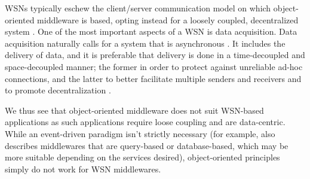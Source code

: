 \documentclass{acm_proc_article-sp}
\begin{document}
WSNs typically eschew the client/server communication model on which object-oriented middleware is based, opting instead for a loosely coupled, decentralized system \cite{Meier:2002p8380}.  One of the most important aspects of a WSN is data acquisition.  Data acquisition naturally calls for a system that is asynchronous \cite{Wang:2008p8370}.  It includes the delivery of data, and it is preferable that delivery is done in a time-decoupled and space-decoupled manner; the former in order to protect against unreliable ad-hoc connections, and the latter to better facilitate multiple senders and receivers and to promote decentralization \cite{Meier:2002p8380}.

We thus see that object-oriented middleware does not suit WSN-based applications as such applications require loose coupling and are data-centric.  While an event-driven paradigm isn't strictly necessary (for example, \cite{Wang:2008p8370} also describes middlewares that are query-based or database-based, which may be more suitable depending on the services desired), object-oriented principles simply do not work for WSN middlewares.






\end{document}
